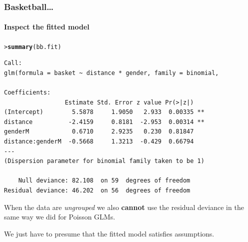 \documentclass{beamer}\usepackage[]{graphicx}\usepackage[]{xcolor}
\makeatletter
\newcommand{\hlstd}[1]{\textcolor[rgb]{0.345,0.345,0.345}{#1}}%
\newcommand{\hlkwd}[1]{\textcolor[rgb]{0.737,0.353,0.396}{\textbf{#1}}}%
\newenvironment{kframe}{%
 \def\at@end@of@kframe{}%
 \ifinner\ifhmode%
  \def\at@end@of@kframe{\end{minipage}}%
  \begin{minipage}{\columnwidth}%
 \fi\fi%
 \def\FrameCommand##1{\hskip\@totalleftmargin \hskip-\fboxsep
 \colorbox{shadecolor}{##1}\hskip-\fboxsep
     \hskip-\linewidth \hskip-\@totalleftmargin \hskip\columnwidth}%
 \MakeFramed {\advance\hsize-\width
   \@totalleftmargin\z@ \linewidth\hsize
   \@setminipage}}%
 {\par\unskip\endMakeFramed%
 \at@end@of@kframe}
\newenvironment{knitrout}{}{} %
\makeatother
\begin{document}
\begin{frame}[fragile]
\frametitle{Basketball\ldots}
\framesubtitle{Inspect the fitted model}
\begin{knitrout}\scriptsize
{}\color{fgcolor}\begin{kframe}
\begin{alltt}
\hlstd{> }\hlkwd{summary}\hlstd{(bb.fit)}
\end{alltt}
\end{kframe}
\end{knitrout}

\begin{knitrout}\scriptsize
{}\color{fgcolor}\begin{kframe}
\begin{verbatim}
Call:
glm(formula = basket ~ distance * gender, family = binomial, 

Coefficients:
                 Estimate Std. Error z value Pr(>|z|)   
(Intercept)        5.5878     1.9050   2.933  0.00335 **
distance          -2.4159     0.8181  -2.953  0.00314 **
genderM            0.6710     2.9235   0.230  0.81847   
distance:genderM  -0.5668     1.3213  -0.429  0.66794   
---
(Dispersion parameter for binomial family taken to be 1)

    Null deviance: 82.108  on 59  degrees of freedom
Residual deviance: 46.202  on 56  degrees of freedom
\end{verbatim}
\end{kframe}
\end{knitrout}

When the data are \emph{ungrouped} we also {\bf cannot} use the residual deviance in the same way we did for Poisson GLMs.
\medskip

We just have to presume that the fitted model satisfies assumptions.
\end{frame}
\end{document}
